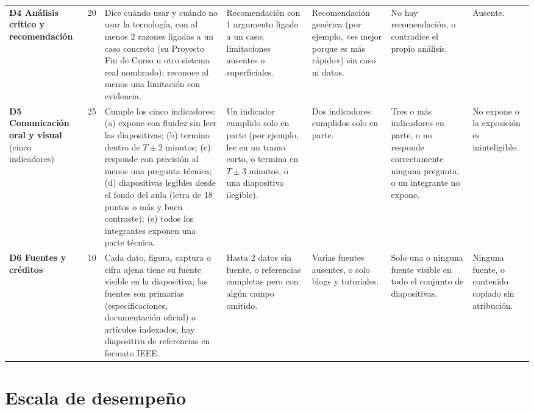\documentclass[11pt,a4paper]{article}
\begin{document}
\begin{landscape}
{\begin{xltabular}{\linewidth}{@{}L{2.7cm}C{0.8cm}YYYYL{2.4cm}@{}}
	\addlinespace
	\textbf{D4 Análisis crítico y recomendación} & 20 & Dice cuándo usar y cuándo no usar la tecnología, con al menos 2 razones ligadas a un caso concreto (su Proyecto Fin de Curso u otro sistema real nombrado); reconoce al menos una limitación con evidencia. & Recomendación con 1 argumento ligado a un caso; limitaciones ausentes o superficiales. & Recomendación genérica (por ejemplo, «es mejor porque es más rápido») sin caso ni datos. & No hay recomendación, o contradice el propio análisis. & Ausente. \\
	\addlinespace
	\textbf{D5 Comunicación oral y visual} (cinco indicadores) & 25 & Cumple los cinco indicadores: (a) expone con fluidez sin leer las diapositivas; (b) termina dentro de $T \pm 2$ minutos; (c) responde con precisión al menos una pregunta técnica; (d) diapositivas legibles desde el fondo del aula (letra de 18 puntos o más y buen contraste); (e) todos los integrantes exponen una parte técnica. & Un indicador cumplido solo en parte (por ejemplo, lee en un tramo corto, o termina en $T \pm 3$ minutos, o una diapositiva ilegible). & Dos indicadores cumplidos solo en parte. & Tres o más indicadores en parte, o no responde correctamente ninguna pregunta, o un integrante no expone. & No expone o la exposición es ininteligible. \\
	\addlinespace
	\textbf{D6 Fuentes y créditos} & 10 & Cada dato, figura, captura o cifra ajena tiene su fuente visible en la diapositiva; las fuentes son primarias (especificaciones, documentación oficial) o artículos indexados; hay diapositiva de referencias en formato IEEE. & Hasta 2 datos sin fuente, o referencias completas pero con algún campo omitido. & Varias fuentes ausentes, o solo blogs y tutoriales. & Solo una o ninguna fuente visible en todo el conjunto de diapositivas. & Ninguna fuente, o contenido copiado sin atribución. \\
\end{xltabular}
}
\end{landscape}

\section{Escala de desempeño}\label{sec:niveles}
\end{document}
